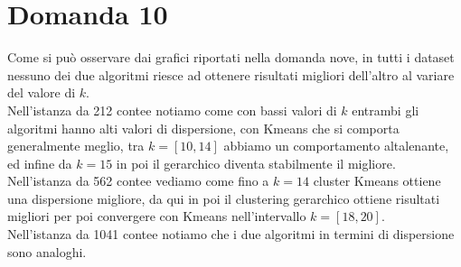 \documentclass{article}
\begin{document}
\section*{Domanda 10}
Come si può osservare dai grafici riportati nella domanda nove, in tutti i dataset nessuno dei due algoritmi riesce ad ottenere risultati migliori dell'altro al variare del valore di $k$.\\
Nell'istanza da 212 contee notiamo come con bassi valori di $k$ entrambi gli algoritmi hanno alti valori di dispersione, con Kmeans che si comporta generalmente meglio, tra $k=[10,14]$ abbiamo un comportamento altalenante, ed infine da $k=15$ in poi il gerarchico diventa stabilmente il migliore.\\
Nell'istanza da 562 contee vediamo come fino a $k=14$ cluster Kmeans ottiene una dispersione migliore, da qui in poi il clustering gerarchico ottiene risultati migliori per poi convergere con Kmeans nell'intervallo $k=[18,20]$.\\
Nell'istanza da 1041 contee notiamo che i due algoritmi in termini di dispersione sono analoghi.
\end{document}
